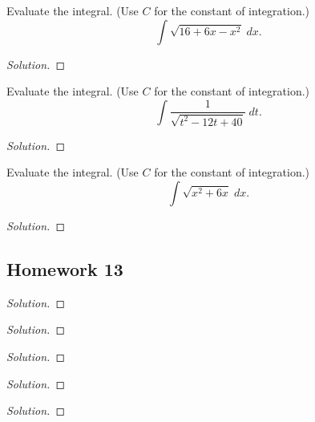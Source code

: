 \begin{problem}[WebAssign, HW 12, \# 3]
Evaluate the integral. (Use $C$ for the constant of integration.)
\[
\int\sqrt{16+6x-x^2}\;dx.
\]
\end{problem}
\begin{proof}[Solution]
\end{proof}

\begin{problem}[WebAssign, HW 12, \# 4]
Evaluate the integral. (Use $C$ for the constant of integration.)
\[
\int\frac{1}{\sqrt{t^2-12t+40}}\;dt.
\]
\end{problem}
\begin{proof}[Solution]
\end{proof}

\begin{problem}[WebAssign, HW 12, \# 5]
Evaluate the integral. (Use $C$ for the constant of integration.)
\[
\int\sqrt{x^2+6x}\;dx.
\]
\end{problem}
\begin{proof}[Solution]
\end{proof}

\subsection{Homework 13}
\begin{problem}[WebAssign, HW 13, \# 1]
\end{problem}
\begin{proof}[Solution]
\end{proof}

\begin{problem}[WebAssign, HW 13, \# 2]
\end{problem}
\begin{proof}[Solution]
\end{proof}

\begin{problem}[WebAssign, HW 13, \# 3]
\end{problem}
\begin{proof}[Solution]
\end{proof}

\begin{problem}[WebAssign, HW 13, \# 4]
\end{problem}
\begin{proof}[Solution]
\end{proof}

\begin{problem}[WebAssign, HW 13, \# 5]
\end{problem}
\begin{proof}[Solution]
\end{proof}

